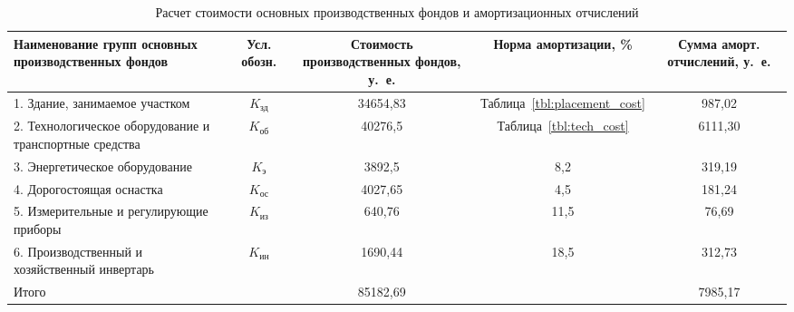\begin{table} [h!]
  \caption{
    Расчет стоимости основных производственных фондов и
    амортизационных отчислений
  }\label{tbl:common_cost}
  {\small
    \begin{tabular}{| m{4cm} | c | c | c | c |}
      \hline
        \parbox{4cm}{
          \smallskip
          \centering Наименование групп основных производственных фондов \\
          \smallskip
        }
      & \parbox{2cm}{
          Усл. обозн.
        }
      & \parbox{3.3cm}{
          \centering Стоимость производственных фондов, у.~е.
        }
      & \parbox{2.5cm}{
          \centering Норма амортизации, \%
        }
      & \parbox{2.5cm}{
          \centering Сумма аморт. отчислений, у.~е.
        } \\
      \hline

      1. Здание, занимаемое участком 
      & \( K_{\text{зд}} \) 
      & 34654{,}83 & Таблица~\ref{tbl:placement_cost} & 987{,}02 \\
      \hline

      2. Технологическое \newline оборудование и \newline транспортные средства 
      & \( K_{\text{об}} \) 
      & 40276{,}5 & Таблица~\ref{tbl:tech_cost} & 6111{,}30 \\
      \hline

      3. Энергетическое \newline оборудование
      & \( K_{\text{э}} \) 
      & 3892{,}5 & 8{,}2 & 319{,}19 \\
      \hline

      4. Дорогостоящая \newline оснастка
      & \( K_{\text{ос}} \) 
      & 4027{,}65 & 4{,}5 & 181{,}24 \\
      \hline

      5. Измерительные \newline и регулирующие \newline приборы
      & \( K_{\text{из}} \) 
      & 640{,}76 & 11{,}5 & 76{,}69 \\
      \hline

      6. Производственный \newline и хозяйственный \newline инвертарь
      & \( K_{\text{ин}} \) 
      & 1690{,}44 & 18{,}5 & 312{,}73 \\
      \hline

      Итого & & 85182{,}69 & & 7985{,}17 \\
      \hline
    \end{tabular}
  }
\end{table}
